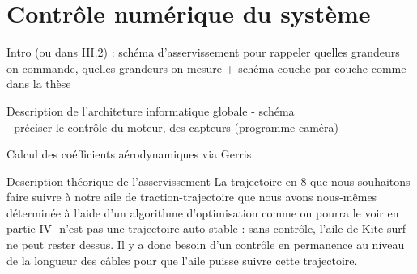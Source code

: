 \documentclass[a4paper,twoside,12pt]{article}
\newcounter{partie}
\newcounter{sous-partie}
\newenvironment{partie}[1]
{
\section{#1}
}
{

}
\newenvironment{sous-partie}[1]
{
\subsection{#1}
}
{

}
\begin{document}
\begin{partie}{Contrôle numérique du système}
Intro (ou dans III.2) : schéma d'asservissement pour rappeler quelles grandeurs on commande, quelles grandeurs on mesure + schéma couche par  couche comme dans la thèse

\begin{sous-partie}{Description de l'architeture informatique globale}
- schéma
\\
- préciser le contrôle du moteur, des capteurs (programme caméra)
\end{sous-partie}
\begin{sous-partie}{Calcul des coéfficients aérodynamiques via Gerris}

\end{sous-partie}

\begin{sous-partie}{Description théorique de l'asservissement}
La trajectoire en 8 que nous souhaitons faire suivre à notre aile de traction-trajectoire que nous avons nous-mêmes déterminée à l'aide d'un algorithme d'optimisation comme on pourra le voir en partie IV- n'est pas une trajectoire auto-stable : sans contrôle, l'aile de Kite surf ne peut rester dessus. %
Il y a donc besoin d'un contrôle en permanence au niveau de la longueur des câbles pour que l'aile puisse suivre cette trajectoire. %


\end{sous-partie}
\end{partie}
\end{document}
